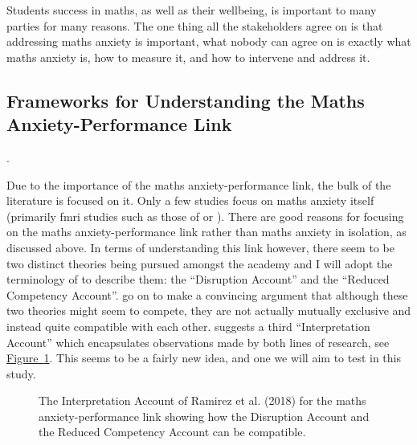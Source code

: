 \documentclass[14pt]{memoir}
\newcommand{\reffig}[1]{\hyperref[fig:#1]{Figure~\ref{fig:#1}}}
\begin{document}
Students success in maths, as well as their wellbeing, is important to many parties for many reasons. The one thing all the stakeholders agree on is that addressing maths anxiety is important, what nobody can agree on is exactly what maths anxiety is, how to measure it, and how to intervene and address it.



\subsection*{Frameworks for Understanding the Maths Anxiety-Performance Link}.

Due to the importance of the maths anxiety-performance link, the bulk of the literature is focused on it. Only a few studies focus on maths anxiety itself (primarily \gls{fmri} studies such as those of   or ). There are good reasons for focusing on the maths anxiety-performance link rather than maths anxiety in isolation, as discussed above. In terms of understanding this link however, there seem to be two distinct theories being pursued amongst the academy and I will adopt the terminology of  to describe them: the ``Disruption Account'' and the ``Reduced Competency Account''.  go on to make a convincing argument that although these two theories might seem to compete, they are not actually mutually exclusive and instead quite compatible with each other.  suggests a third ``Interpretation Account'' which encapsulates observations made by both lines of research, see \reffig{ramirez}. This seems to be a fairly new idea, and one we will aim to test in this study. 

\begin{center}
\begin{figure}
\begin{center}
\end{center}
\caption{The Interpretation Account of Ramirez et al. (2018) for the maths anxiety-performance link showing how the Disruption Account and the Reduced Competency Account can be compatible.
\label{fig:ramirez}}
\end{figure}
\end{center}
\end{document}
